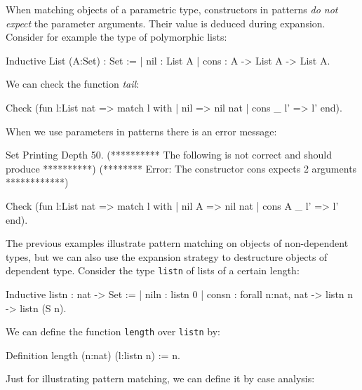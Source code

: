 When matching objects of a parametric type, constructors in patterns
{\em do not expect} the parameter arguments. Their value is deduced
during expansion.
Consider for example the type of polymorphic lists:

\begin{coq_example}
Inductive List (A:Set) : Set :=
  | nil : List A
  | cons : A -> List A -> List A.
\end{coq_example}

We can check the function {\em tail}:

\begin{coq_example}
Check
  (fun l:List nat =>
     match l with
     | nil => nil nat
     | cons _ l' => l'
     end).
\end{coq_example}


When we use parameters in patterns there is an error message:
\begin{coq_eval}
Set Printing Depth 50.
(********** The following is not correct and should produce **********)
(******** Error: The constructor cons expects 2 arguments ************)
\end{coq_eval}
\begin{coq_example}
Check
  (fun l:List nat =>
     match l with
     | nil A => nil nat
     | cons A _ l' => l'
     end).
\end{coq_example}



The previous examples illustrate pattern matching on objects of
non-dependent types, but we can also 
use the expansion strategy to destructure objects of dependent type.
Consider the type \texttt{listn} of lists of a certain length:
\label{listn}

\begin{coq_example}
Inductive listn : nat -> Set :=
  | niln : listn 0
  | consn : forall n:nat, nat -> listn n -> listn (S n).
\end{coq_example}

We can define the function \texttt{length} over \texttt{listn} by:

\begin{coq_example}
Definition length (n:nat) (l:listn n) := n.
\end{coq_example}

Just for illustrating pattern matching, 
we can define it by case analysis:

